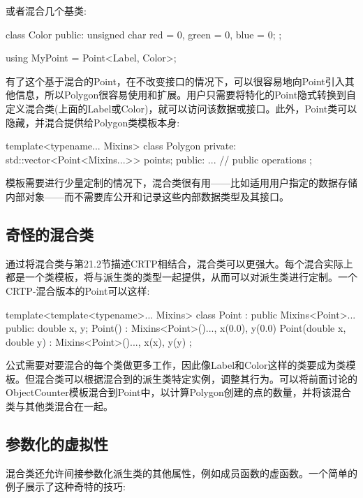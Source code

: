 或者混合几个基类:

\begin{cpp}
class Color
{
	public:
	unsigned char red = 0, green = 0, blue = 0;
};

using MyPoint = Point<Label, Color>;
\end{cpp}

有了这个基于混合的Point，在不改变接口的情况下，可以很容易地向Point引入其他信息，所以Polygon很容易使用和扩展。用户只需要将特化的Point隐式转换到自定义混合类(上面的Label或Color)，就可以访问该数据或接口。此外，Point类可以隐藏，并混合提供给Polygon类模板本身:

\begin{cpp}
template<typename... Mixins>
class Polygon
{
	private:
	std::vector<Point<Mixins...>> points;
	public:
	... // public operations
};
\end{cpp}

模板需要进行少量定制的情况下，混合类很有用——比如适用用户指定的数据存储内部对象——而不需要库公开和记录这些内部数据类型及其接口。

\subsection{奇怪的混合类}

通过将混合类与第21.2节描述CRTP相结合，混合类可以更强大。每个混合实际上都是一个类模板，将与派生类的类型一起提供，从而可以对派生类进行定制。一个CRTP-混合版本的Point可以这样:

\begin{cpp}
template<template<typename>... Mixins>
class Point : public Mixins<Point>...
{
	public:
	double x, y;
	Point() : Mixins<Point>()..., x(0.0), y(0.0) { }
	Point(double x, double y) : Mixins<Point>()..., x(x), y(y) { }
};
\end{cpp}

公式需要对要混合的每个类做更多工作，因此像Label和Color这样的类要成为类模板。但混合类可以根据混合到的派生类特定实例，调整其行为。可以将前面讨论的ObjectCounter模板混合到Point中，以计算Polygon创建的点的数量，并将该混合类与其他类混合在一起。

\subsection{参数化的虚拟性}

混合类还允许间接参数化派生类的其他属性，例如成员函数的虚函数。一个简单的例子展示了这种奇特的技巧:

